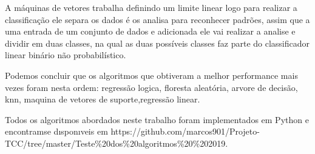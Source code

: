 A máquinas de vetores trabalha definindo um limite linear logo para realizar a classificação ele separa os dados é os analisa para reconhecer padrões, assim que a uma entrada de um conjunto de dados e adicionada ele vai realizar a analise e dividir em duas classes, na qual as duas possíveis classes faz parte do classificador linear binário não probabilístico.

Podemos concluir que os algoritmos que obtiveram a melhor performance mais vezes foram
nesta ordem: regressão logica, floresta aleatória, arvore de decisão, knn, maquina de vetores de suporte,regressão linear. 

Todos os algoritmos abordados neste trabalho foram implementados em Python e encontramse dısponıveis em https://github.com/marcos901/Projeto-TCC/tree/master/Teste\%20dos\%20algoritmos\%20\%202019.





